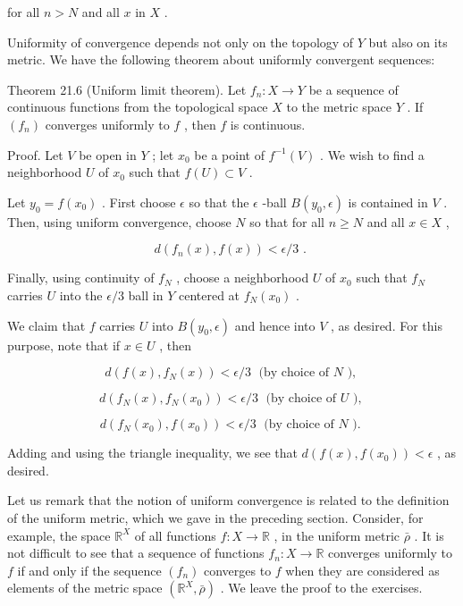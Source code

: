 for all \(n > N\) and all \(x\) in \(X\) .

Uniformity of convergence depends not only on the topology of \(Y\) but also on its metric. We have the following theorem about uniformly convergent sequences:

Theorem 21.6 (Uniform limit theorem). Let \({f}_{n} : X \rightarrow  Y\) be a sequence of continuous functions from the topological space \(X\) to the metric space \(Y\) . If \(\left( {f}_{n}\right)\) converges uniformly to \(f\) , then \(f\) is continuous.

Proof. Let \(V\) be open in \(Y\) ; let \({x}_{0}\) be a point of \({f}^{-1}\left( V\right)\) . We wish to find a neighborhood \(U\) of \({x}_{0}\) such that \(f\left( U\right)  \subset  V\) .

Let \({y}_{0} = f\left( {x}_{0}\right)\) . First choose \(\epsilon\) so that the \(\epsilon\) -ball \(B\left( {{y}_{0},\epsilon }\right)\) is contained in \(V\) . Then, using uniform convergence, choose \(N\) so that for all \(n \geq  N\) and all \(x \in  X\) ,

\[
d\left( {{f}_{n}\left( x\right) ,f\left( x\right) }\right)  < \epsilon /3\text{ . }
\]

Finally, using continuity of \({f}_{N}\) , choose a neighborhood \(U\) of \({x}_{0}\) such that \({f}_{N}\) carries \(U\) into the \(\epsilon /3\) ball in \(Y\) centered at \({f}_{N}\left( {x}_{0}\right)\) .

We claim that \(f\) carries \(U\) into \(B\left( {{y}_{0},\epsilon }\right)\) and hence into \(V\) , as desired. For this purpose, note that if \(x \in  U\) , then

\[
d\left( {f\left( x\right) ,{f}_{N}\left( x\right) }\right)  < \epsilon /3\;\text{ (by choice of }N\text{ ), }
\]

\[
d\left( {{f}_{N}\left( x\right) ,{f}_{N}\left( {x}_{0}\right) }\right)  < \epsilon /3\;\text{ (by choice of }U\text{ ), }
\]

\[
d\left( {{f}_{N}\left( {x}_{0}\right) ,f\left( {x}_{0}\right) }\right)  < \epsilon /3\;\text{ (by choice of }N\text{ ). }
\]

Adding and using the triangle inequality, we see that \(d\left( {f\left( x\right) ,f\left( {x}_{0}\right) }\right)  < \epsilon\) , as desired.

Let us remark that the notion of uniform convergence is related to the definition of the uniform metric, which we gave in the preceding section. Consider, for example, the space \({\mathbb{R}}^{X}\) of all functions \(f : X \rightarrow  \mathbb{R}\) , in the uniform metric \(\bar{\rho }\) . It is not difficult to see that a sequence of functions \({f}_{n} : X \rightarrow  \mathbb{R}\) converges uniformly to \(f\) if and only if the sequence \(\left( {f}_{n}\right)\) converges to \(f\) when they are considered as elements of the metric space \(\left( {{\mathbb{R}}^{X},\bar{\rho }}\right)\) . We leave the proof to the exercises.


